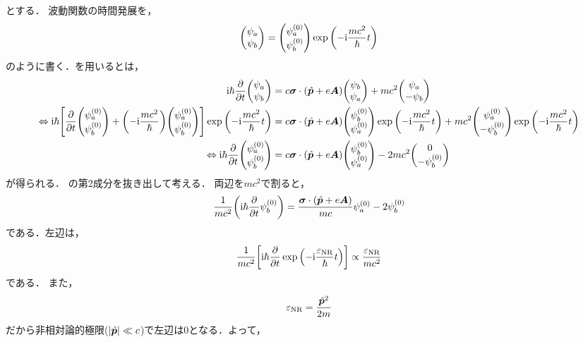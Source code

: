 \documentclass{report}
\begin{document}
  とする．
  波動関数の時間発展を，
  \begin{align}
    \mqty(\psi_a \\ \psi_b)
    = \mqty(\psi_a^{(0)} \\ \psi_b^{(0)})
    \exp\qty(-\i \frac{mc^2}{\hbar}t)\label{wave-func-change-into-2}
  \end{align}
  のように書く．を用いるとは，
  \begin{align}
    \i\hbar\pdv{t}\mqty(\psi_a\\ \psi_b) &= c\bm{\sigma}\cdot(\hat{\bm{p}} + e\bm{A})\mqty(\psi_b \\ \psi_a) + mc^2\mqty(\psi_a \\ -\psi_b) \\ 
    \Leftrightarrow \i\hbar\qty[\pdv{t}\mqty(\psi_a^{(0)} \\ \psi_b^{(0)}) + \qty(-\i\frac{mc^2}{\hbar})\mqty(\psi_a^{(0)} \\ \psi_b^{(0)})]\exp\qty(-\i\frac{mc^2}{\hbar}t)
    &= c\bm{\sigma}\cdot(\hat{\bm{p}} + e\bm{A})\mqty(\psi_b^{(0)} \\ \psi_a^{(0)})\exp\qty(-\i\frac{mc^2}{\hbar}t) + mc^2\mqty(\psi_a^{(0)} \\ -\psi_b^{(0)})\exp\qty(-\i\frac{mc^2}{\hbar}t) \\ 
    \Leftrightarrow \i\hbar\pdv{t}\mqty(\psi_a^{(0)} \\ \psi_b^{(0)}) &= c\bm{\sigma}\cdot(\hat{\bm{p}} + e\bm{A})\mqty(\psi_b^{(0)} \\ \psi_a^{(0)}) -2mc^2\mqty(0 \\ -\psi_b^{(0)}) \label{before-divide-mc2}
  \end{align}
  が得られる．
  の第2成分を抜き出して考える．
  両辺を$mc^2$で割ると，
  \begin{align}
    \frac{1}{mc^2}\qty(\mathrm{i}\hbar\pdv{t}\psi_b^{(0)}) = \frac{\bm{\sigma}\cdot(\hat{\bm{p}} + e\bm{A})}{mc}\psi^{(0)}_a - 2 \psi^{(0)}_b
  \end{align}
  である．左辺は，
  \begin{align}
    \frac{1}{mc^2}\qty[\mathrm{i}\hbar\pdv{t}\exp\qty(-\mathrm{i}\frac{\varepsilon_{\mathrm{NR}}}{\hbar} t)] \propto \frac{\varepsilon_{\mathrm{NR}}}{mc^2}
  \end{align}
  である．
  また，
  \begin{align}
    \varepsilon_{\mathrm{NR}} = \frac{\hat{\bm{p}}^2}{2m}
  \end{align}
  だから非相対論的極限($\abs{\hat{\bm{p}}} \ll c$)で左辺は0となる．よって，
\end{document}
